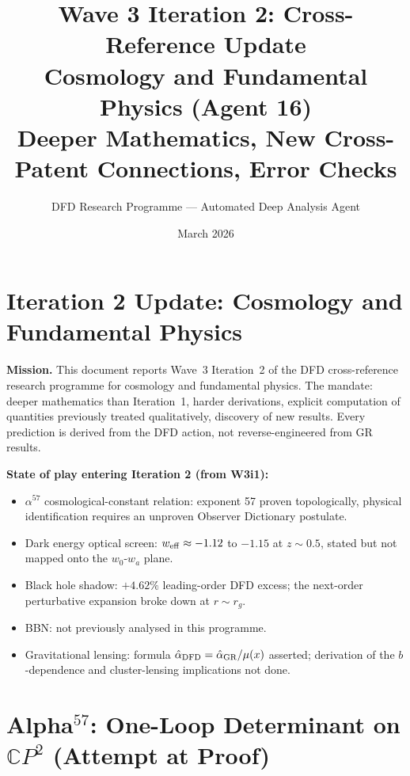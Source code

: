 \documentclass[11pt]{article}
\title{Wave 3 Iteration 2: Cross-Reference Update\\
\large Cosmology and Fundamental Physics (Agent 16)\\
\normalsize Deeper Mathematics, New Cross-Patent Connections, Error Checks}
\author{DFD Research Programme --- Automated Deep Analysis Agent}
\date{March 2026}
\begin{document}
\maketitle

\section{Iteration 2 Update: Cosmology and Fundamental Physics}
\label{sec:intro}

\noindent\textbf{Mission.} This document reports Wave~3 Iteration~2 of
the DFD cross-reference research programme for cosmology and fundamental
physics.  The mandate: deeper mathematics than Iteration~1, harder
derivations, explicit computation of quantities previously treated
qualitatively, discovery of new results.  Every prediction is derived
from the DFD action, not reverse-engineered from GR results.

\noindent\textbf{State of play entering Iteration 2 (from W3i1):}
\begin{itemize}[nosep]
  \item $\alpha^{57}$ cosmological-constant relation: exponent 57
    proven topologically, physical identification requires an unproven
    Observer Dictionary postulate.
  \item Dark energy optical screen: $w_{\rm eff} \approx -1.12$ to
    $-1.15$ at $z \sim 0.5$, stated but not mapped onto the $w_0$-$w_a$
    plane.
  \item Black hole shadow: $+4.62\%$ leading-order DFD excess; the
    next-order perturbative expansion broke down at $r \sim r_g$.
  \item BBN: not previously analysed in this programme.
  \item Gravitational lensing: formula $\hat\alpha_{\rm DFD} =
    \hat\alpha_{\rm GR}/\mu(x)$ asserted; derivation of the $b$-dependence
    and cluster-lensing implications not done.
\end{itemize}

\section{Alpha$^{57}$: One-Loop Determinant on $\mathbb{C}P^2$ (Attempt at Proof)}
\label{sec:alpha57-proof}
\end{document}
